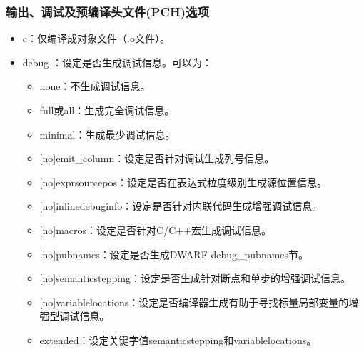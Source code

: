 \documentclass[a4paper,12pt,english]{sphinxmanual}
\begin{document}
\subsubsection{输出、调试及预编译头文件(PCH)选项}
\label{\detokenize{compiler/intel:pch}}\begin{itemize}
\item {} 
\sphinxAtStartPar
\sphinxhyphen{}c：仅编译成对象文件（.o文件）。

\item {} 
\sphinxAtStartPar
\sphinxhyphen{}debug \sphinxstyleemphasis{{[}keyword{]}}：设定是否生成调试信息。可以为：
\begin{itemize}
\item {} 
\sphinxAtStartPar
none：不生成调试信息。

\item {} 
\sphinxAtStartPar
full或all：生成完全调试信息。

\item {} 
\sphinxAtStartPar
minimal：生成最少调试信息。

\item {} 
\sphinxAtStartPar
{[}no{]}emit\_column：设定是否针对调试生成列号信息。

\item {} 
\sphinxAtStartPar
{[}no{]}expr\sphinxhyphen{}source\sphinxhyphen{}pos：设定是否在表达式粒度级别生成源位置信息。

\item {} 
\sphinxAtStartPar
{[}no{]}inline\sphinxhyphen{}debug\sphinxhyphen{}info：设定是否针对内联代码生成增强调试信息。

\item {} 
\sphinxAtStartPar
{[}no{]}macros：设定是否针对C/C++宏生成调试信息。

\item {} 
\sphinxAtStartPar
{[}no{]}pubnames：设定是否生成DWARF debug\_pubnames节。

\item {} 
\sphinxAtStartPar
{[}no{]}semantic\sphinxhyphen{}stepping：设定是否生成针对断点和单步的增强调试信息。

\item {} 
\sphinxAtStartPar
{[}no{]}variable\sphinxhyphen{}locations：设定是否编译器生成有助于寻找标量局部变量的增强型调试信息。

\item {} 
\sphinxAtStartPar
extended：设定关键字值semantic\sphinxhyphen{}stepping和variable\sphinxhyphen{}locations。


\end{itemize}
\end{itemize}
\end{document}
